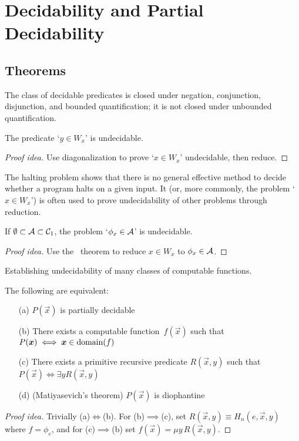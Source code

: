 %
%
%
\section{Decidability and Partial Decidability}
\subsection*{Theorems}
\begin{thm}
The class of decidable predicates is closed under negation, conjunction, disjunction, and bounded quantification; it is not closed under unbounded quantification.
\end{thm}

\begin{thm}
The predicate `\(y\in W_x\)' is undecidable.
\end{thm}
\begin{proof}[Proof idea]
Use diagonalization to prove `\(x\in W_x\)' undecidable, then reduce.
\end{proof}
\begin{app}
The halting problem shows that there is no general effective method to decide whether a program halts on a given input. It (or, more commonly, the problem `\(x\in W_x\)') is often used to prove undecidability of other problems through reduction.
\end{app}

\begin{thm}[Rice]
If \(\emptyset\subset\mathcal{A}\subset\mathcal{C}_1\), the problem `\(\phi_x\in\mathcal{A}\)' is undecidable.
\end{thm}
\begin{proof}[Proof idea]
Use the \smn\ theorem to reduce \(x\in W_x\) to \(\phi_x\in\mathcal{A}\).
\end{proof}
\begin{app}
Establishing undecidability of many classes of computable functions.
\end{app}

\begin{thm}
The following are equivalent:
\begin{enumerate}[itemsep=0pt]
\item[(a)] \(P(\vec{x})\) is partially decidable
\item[(b)] There exists a computable function~\(f(\vec{x})\) such that \(P(\boldsymbol{x})\iff\boldsymbol{x}\in\operatorname{domain}(f)\)
\item[(c)] There exists a primitive recursive predicate \(R(\vec{x},y)\) such that \(P(\vec{x})\iff\exists y R(\vec{x},y)\)
\item[(d)] (Matiyasevich's theorem) \(P(\vec{x})\) is diophantine
\end{enumerate}
\end{thm}
\begin{proof}[Proof idea]
Trivially (a)\(\iff\)(b). For (b)\(\implies\)(c), set \(R(\vec{x},y)\equiv H_n(e,\vec{x},y)\) where \(f=\phi_e\), and for (c)\(\implies\)(b) set \(f(\vec{x})=\mu y\,R(\vec{x},y)\).
\end{proof}

